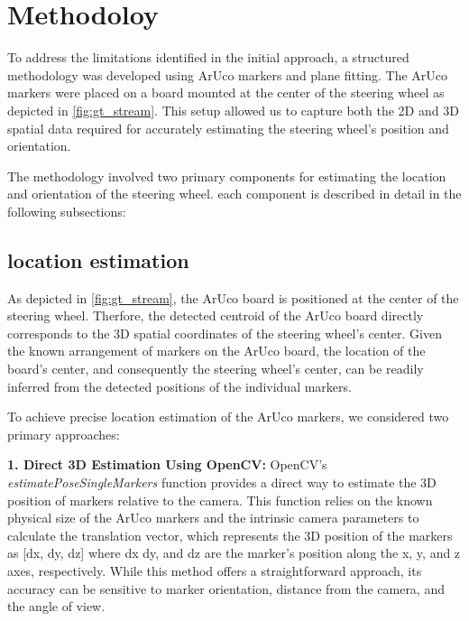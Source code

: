 \section{Methodoloy}
To address the limitations identified in the initial approach, 
a structured methodology was developed using ArUco markers and 
plane fitting. The ArUco markers were placed on a board mounted 
at the center of the steering wheel as depicted in 
\cref{fig:gt_stream}. This setup allowed us to capture both the 
2D and 3D spatial data required for accurately estimating the 
steering wheel's position and orientation.

The methodology involved two primary components for estimating 
the location and orientation of the steering wheel. 
each component is described in detail in the following 
subsections:

\subsection{location estimation}
As depicted in \cref{fig:gt_stream}, the ArUco board is positioned at the center of the steering 
wheel. Therfore, the detected centroid of the ArUco board directly 
corresponds to the 3D spatial coordinates of the steering 
wheel's center. Given the known arrangement of markers on the 
ArUco board, the location of the board's center, and 
consequently the steering wheel's center, can be readily 
inferred from the detected positions of the individual markers.

To achieve precise location estimation of the ArUco markers, 
we considered two primary approaches:

\textbf{1. Direct 3D Estimation Using OpenCV: }
OpenCV’s \emph{estimatePoseSingleMarkers} function provides a direct 
way to estimate the 3D position of markers relative to the camera. 
This function relies on the known physical size of the 
ArUco markers and the intrinsic camera parameters to calculate 
the translation vector, which represents the 3D position of 
the markers as [dx, dy, dz] where dx dy, and dz are the marker's 
position along the x, y, and z axes, respectively. 
While this method offers a straightforward approach, its 
accuracy can be sensitive to marker orientation, distance from 
the camera, and the angle of view.

